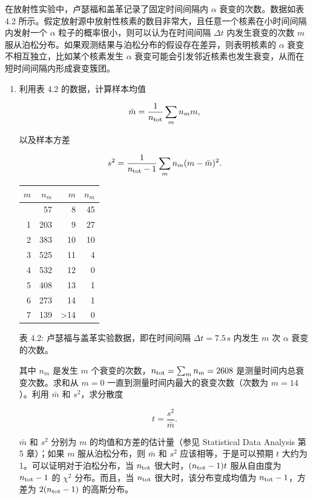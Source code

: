 \begin{question}
在放射性实验中，卢瑟福和盖革记录了固定时间间隔内 \(\alpha\)
衰变的次数。数据如表 4.2
所示。假定放射源中放射性核素的数目非常大，且任意一个核素在小时间间隔内发射一个
\(\alpha\) 粒子的概率很小，则可以认为在时间间隔 \(\Delta t\)
内发生衰变的次数 \(m\)
服从泊松分布。如果观测结果与泊松分布的假设存在差异，则表明核素的
\(\alpha\) 衰变不相互独立，比如某个核素发生 \(\alpha\)
衰变可能会引发邻近核素也发生衰变，从而在短时间间隔内形成衰变簇团。

\begin{enumerate}
\item 利用表 4.2 的数据，计算样本均值

\[
\bar m=\frac{1}{n_{\rm tot}}\sum_m n_m m,
\]

以及样本方差

\[
s^2=\frac{1}{n_{\rm tot}-1}\sum_m n_m(m-\bar m)^2.
\]

{%
\begin{longtable}[]{@{}rrrr@{}}
\toprule\noalign{}
\(m\) & \(n_m\) & \(m\) & \(n_m\) \\
\midrule\noalign{}
\endhead
\bottomrule\noalign{}
\endlastfoot
0 & 57 & 8 & 45 \\
1 & 203 & 9 & 27 \\
2 & 383 & 10 & 10 \\
3 & 525 & 11 & 4 \\
4 & 532 & 12 & 0 \\
5 & 408 & 13 & 1 \\
6 & 273 & 14 & 1 \\
7 & 139 & \textgreater14 & 0 \\
\end{longtable}
}

表 4.2: 卢瑟福与盖革实验数据，即在时间间隔 \(\Delta t=7.5\,\mathrm{s}\)
内发生 \(m\) 次 \(\alpha\) 衰变的次数。

其中 \(n_m\) 是发生 \(m\) 个衰变的次数，\(n_{\rm tot}=\sum_m n_m=2608\)
是测量时间内总衰变次数。求和从 \(m=0\)
一直到测量时间内最大的衰变次数（次数为 \(m=14\)）。利用 \(\bar m\) 和
\(s^2\)，求分散度

\[
t=\frac{s^2}{\bar m}.
\]

\(\bar m\) 和 \(s^2\) 分别为 \(m\) 的均值和方差的估计量（参见
Statistical Data Analysis 第 5 章）；如果 \(m\) 服从泊松分布，则
\(\bar m\) 和 \(s^2\) 应该相等，于是可以预期 \(t\) 大约为
1。可以证明对于泊松分布，当 \(n_{\rm tot}\) 很大时，\((n_{\rm tot}-1)t\)
服从自由度为 \(n_{\rm tot}-1\) 的 \(\chi^2\) 分布。而且，当
\(n_{\rm tot}\) 很大时，该分布变成均值为 \(n_{\rm tot}-1\)，方差为
\(2(n_{\rm tot}-1)\) 的高斯分布。


\end{enumerate}
\end{question}
